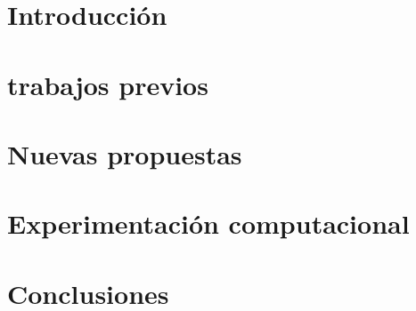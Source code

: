 \documentclass[11pt,a4paper]{tesis}
\begin{document}
\def\titulo{Licenciado }
\def\autor{Amit Stein, Juan Andrés Knebel}
\def\tituloTesis{Nuevos algoritmos para recuperación de ``ítems empaquetados''}
\def\runtitulo{Nuevos algoritmos para recuperación de ``ítems empaquetados''}
\def\runtitle{New Algorithms for composite retrival}
\def\director{Esteban Feuerstein}
\def\codirector{Isabel Méndez Diaz}
\def\codirectordos{Paula Zabala}
\def\lugar{Buenos Aires, 2017}


\frontmatter
\pagestyle{empty}


\cleardoublepage
%



\cleardoublepage
\tableofcontents

\mainmatter
\pagestyle{headings}


\chapter{Introducción}
\label{chap:introduccion}

\chapter{trabajos previos}
\label{chap:trabajos-previos}

\chapter{Nuevas propuestas}
\label{chap:nuevas-propuestas}

\chapter{Experimentación computacional}
\label{chap:experimentacion}

\chapter{Conclusiones}
\label{chap:conclusiones}

%


\backmatter

 
\end{document}
